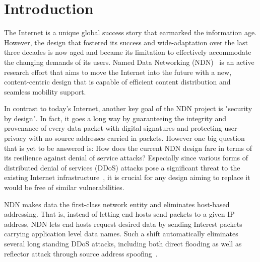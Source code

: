 \section{Introduction}
\label{sec:intro}





The Internet is a unique global success story that earmarked the information age. However, the design that fostered its success and wide-adaptation over the last three decades is now aged and became its limitation to effectively accommodate the changing demands of its users. Named Data Networking (NDN)~\cite{ndn-conext, ndn-tr} is an active research effort that aims to move the Internet into the future with a new, content-centric design that is capable of efficient content distribution and seamless mobility support. 

In contrast to today's Internet, another key goal of the NDN project is "security by design". In fact, it goes a long way by guaranteeing the integrity and provenance of every data packet with digital signatures and protecting user-privacy with no source addresses carried in packets. However one big question that is yet to be answered is: How does the current NDN design fare in terms of its resilience against denial of service attacks? Especially since various forms of distributed denial of services (DDoS) attacks pose a significant threat to the existing Internet infrastructure~\cite{arbor-report}, it is crucial for any design aiming to replace it would be free of similar vulnerabilities.

NDN makes data the first-class network entity and eliminates host-based addressing. That is, instead of letting end hosts send packets
to a given IP address, NDN lets end hosts request desired
data by sending Interest packets carrying application level
data names. Such a shift automatically eliminates several long
standing DDoS attacks, including both direct flooding as well
as reflector attack through source address spoofing~\cite{mirkovic2004taxonomy}.

